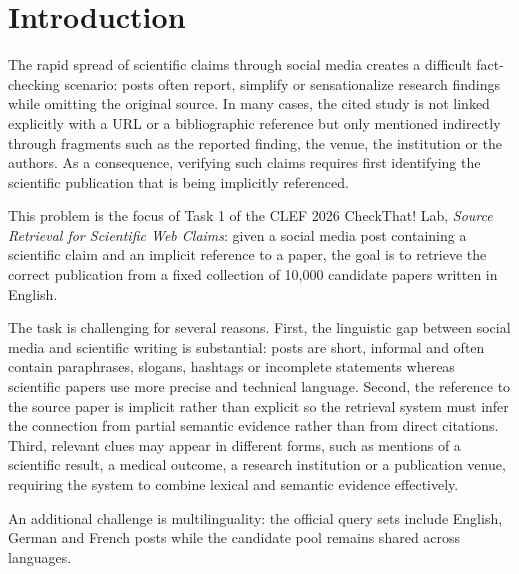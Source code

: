 \section{Introduction}
\label{sec:introduction}

The rapid spread of scientific claims through social media creates a difficult fact-checking scenario: posts often report, simplify or sensationalize research findings while omitting the original source. In many cases, the cited study is not linked explicitly with a URL or a bibliographic reference but only mentioned indirectly through fragments such as the reported finding, the venue, the institution or the authors. As a consequence, verifying such claims requires first identifying the scientific publication that is being implicitly referenced.

This problem is the focus of Task 1 of the CLEF 2026 CheckThat! Lab, \emph{Source Retrieval for Scientific Web Claims}: given a social media post containing a scientific claim and an implicit reference to a paper, the goal is to retrieve the correct publication from a fixed collection of 10,000 candidate papers written in English.

The task is challenging for several reasons. First, the linguistic gap between social media and scientific writing is substantial: posts are short, informal and often contain paraphrases, slogans, hashtags or incomplete statements whereas scientific papers use more precise and technical language. Second, the reference to the source paper is implicit rather than explicit so the retrieval system must infer the connection from partial semantic evidence rather than from direct citations. Third, relevant clues may appear in different forms, such as mentions of a scientific result, a medical outcome, a research institution or a publication venue, requiring the system to combine lexical and semantic evidence effectively.

An additional challenge is multilinguality: the official query sets include English, German and French posts while the candidate pool remains shared across languages.

